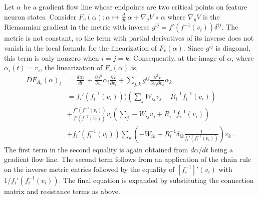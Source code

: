 \documentclass[12pt]{article}
\begin{document}
Let $\alpha$ be a gradient flow line whose endpoints are two critical points on feature neuron states. Consider $F_v(\alpha): \alpha \mapsto \frac{d}{dt} \, \alpha + \nabla_g V \, \circ \, \alpha$ where $\nabla_g V$ is the Riemannian gradient in the metric with inverse $g^{ij} = f'(f^{-1}(v_i))\delta^{ij}$. The metric is not constant, so the term with partial derivatives of its inverse does not vanish in the local formula for the linearization of $F_v(\alpha)$. Since $g^{ij}$ is diagonal, this term is only nonzero when $i=j=k$. Consequently, at the image of $\alpha$, where $\alpha_i(t) = v_i$, the linearization of $F_v(\alpha)$ is,
\begin{align*}
    DF_{A_{v}}(\alpha)_i &= \frac{d\alpha_i}{dt} \,  + \frac{\partial g^{ii}}{\partial v_i}\alpha_i \frac{\partial V}{\partial v_i} + \sum_{j,k} g^{ij} \frac{\partial^2 V}{\partial v_j \partial v_k}\alpha_k \nonumber\\
    &=  f_i'(f_i^{-1}(v_i)))\left(\sum_{j} W_{ij} v_j  - R^{-1}_{i} f_i^{-1}(v_i)\right) \\
    &+  \frac{f''(f^{-1}(v_i))}{f'(f^{-1}(v_i))} v_i \left(\sum_{j} -W_{ij} v_j  + R^{-1}_{i} f_i^{-1}(v_i)\right)\\
    &+ f_i'(f_i^{-1}(v_i))\sum_k \left( - W_{ik} + R^{-1}_{i } \delta_{ik}\frac{1}{f_i'(f_i^{-1}(v_i))} \right) v_k \,.
\end{align*}
The first term in the second equality is again obtained from $d\alpha /dt$ being a gradient flow line. The second term follows from an application of the chain rule on the inverse metric entries followed by the equality of $[f_i^{-1}]'(v_i)$ with $1/f_i'(f^{-1}_i(v_i))$. The final equation is expanded by substituting the connection matrix and resistance terms as above. 
\end{document}
